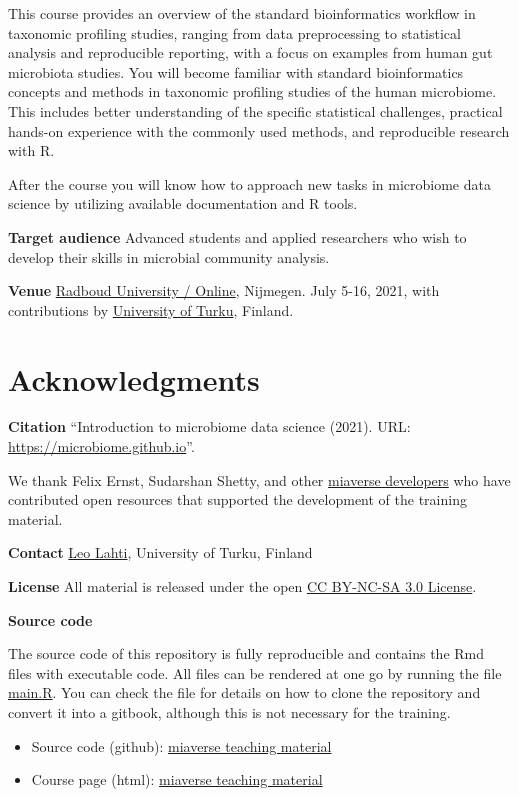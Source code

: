 \documentclass[
  oneside]{book}
\providecommand{\tightlist}{%
  \setlength{\itemsep}{0pt}\setlength{\parskip}{0pt}}
\begin{document}
This course provides an overview of the standard bioinformatics
workflow in taxonomic profiling studies, ranging from data
preprocessing to statistical analysis and reproducible reporting, with
a focus on examples from human gut microbiota studies. You
will become familiar with standard bioinformatics concepts and methods
in taxonomic profiling studies of the human microbiome. This includes
better understanding of the specific statistical challenges, practical
hands-on experience with the commonly used methods, and reproducible
research with R.

After the course you will know how to approach new tasks in microbiome
data science by utilizing available documentation and R tools.

\textbf{Target audience} Advanced students and applied researchers who wish
to develop their skills in microbial community analysis.

\textbf{Venue} \href{}{Radboud University / Online}, Nijmegen. July 5-16, 2021,
with contributions by \href{http://datascience.utu.fi}{University of
Turku}, Finland.

\hypertarget{acknowledgments}{%
\section{Acknowledgments}\label{acknowledgments}}

\textbf{Citation} ``Introduction to microbiome data science (2021). URL: \url{https://microbiome.github.io}''.

\citet{radboud2021course}

We thank Felix Ernst, Sudarshan Shetty, and other \href{https://microbiome.github.io}{miaverse
developers} who have contributed open
resources that supported the development of the training material.

\textbf{Contact} \href{http://datascience.utu.fi}{Leo Lahti}, University of Turku, Finland

\textbf{License} All material is released under the open \href{LICENSE}{CC BY-NC-SA 3.0 License}.

\textbf{Source code}

The source code of this repository is fully reproducible and contains
the Rmd files with executable code. All files can be rendered at one
go by running the file \url{main.R}. You can check the file for
details on how to clone the repository and convert it into a gitbook,
although this is not necessary for the training.

\begin{itemize}
\tightlist
\item
  Source code (github): \href{https://github.com/microbiome/course_2021_radboud}{miaverse teaching material}
\item
  Course page (html): \href{https://microbiome.github.io/course_2021_radboud/}{miaverse teaching material}
\end{itemize}
\end{document}
